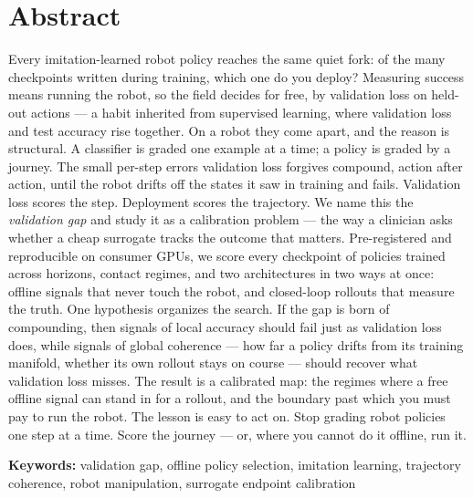 
\section*{Abstract}

Every imitation-learned robot policy reaches the same quiet fork: of the many checkpoints
written during training, which one do you deploy? Measuring success means running the robot,
so the field decides for free, by validation loss on held-out actions --- a habit inherited
from supervised learning, where validation loss and test accuracy rise together. On a robot
they come apart, and the reason is structural. A classifier is graded one example at a time;
a policy is graded by a journey. The small per-step errors validation loss forgives compound,
action after action, until the robot drifts off the states it saw in training and fails.
Validation loss scores the step. Deployment scores the trajectory. We name this the
\emph{validation gap} and study it as a calibration problem --- the way a clinician asks
whether a cheap surrogate tracks the outcome that matters. Pre-registered and reproducible on
consumer GPUs, we score every checkpoint of policies trained across horizons, contact regimes,
and two architectures in two ways at once: offline signals that never touch the robot, and
closed-loop rollouts that measure the truth. One hypothesis organizes the search. If the gap
is born of compounding, then signals of local accuracy should fail just as validation loss
does, while signals of global coherence --- how far a policy drifts from its training
manifold, whether its own rollout stays on course --- should recover what validation loss
misses. The result is a calibrated map: the regimes where a free offline signal can stand in
for a rollout, and the boundary past which you must pay to run the robot. The lesson is easy
to act on. Stop grading robot policies one step at a time. Score the journey --- or, where
you cannot do it offline, run it.

\medskip
\noindent\textbf{Keywords:} validation gap, offline policy selection, imitation learning,
trajectory coherence, robot manipulation, surrogate endpoint calibration

